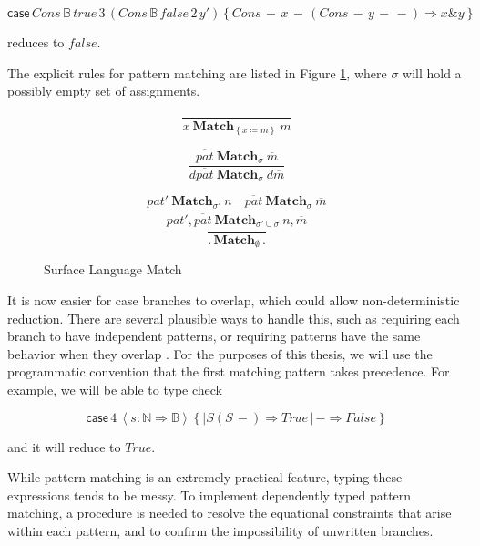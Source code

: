 $\mathsf{case}\,Cons\,\mathbb{B}\,true\,3\,\left(Cons\,\mathbb{B}\,false\,2\,y'\right)\left\{ Cons\,-\,x\,-\,\left(Cons\,-\,y\,-\,-\right)\Rightarrow x\&y\right\} $

reduces to $false$.

The explicit rules for pattern matching are listed in Figure \ref{fig:surface-data-match}, where $\sigma$ will hold a possibly empty set of assignments.

\begin{figure}
\[
\frac{\,}{x\ \mathbf{Match}_{\left\{ x\coloneqq m\right\} }\ m}
\]

\[
\frac{\overline{pat}\ \mathbf{Match}_{\sigma}\ \overline{m}}{d\overline{pat}\ \mathbf{Match}_{\sigma}\ d\overline{m}}
\]

\[
\frac{pat'\ \mathbf{Match}_{\sigma'}\ n\quad\overline{pat}\ \mathbf{Match}_{\sigma}\ \overline{m}}{pat',\overline{pat}\ \mathbf{Match}_{\sigma'\cup\sigma}\ n,\overline{m}}
\]
\[
\frac{\,}{.\,\mathbf{Match}_{\emptyset}\,.}
\]

\caption{Surface Language Match}
\label{fig:surface-data-match}
\end{figure}

It is now easier for case branches to overlap, which could allow non-deterministic reduction.
There are several plausible ways to handle this, such as requiring each branch to have independent patterns, or requiring patterns have the same behavior when they overlap \cite{10.1007/978-3-642-54833-8_6}.
For the purposes of this thesis, we will use the programmatic convention that the first matching pattern takes precedence.
For example, we will be able to type check

\[
\mathsf{case}\,4\,\left\langle s:\mathbb{N}\Rightarrow\mathbb{B}\right\rangle \left\{ |S\left(S\,-\right)\Rightarrow True\,|\,-\Rightarrow False\right\} 
\]

and it will reduce to $True$.

While pattern matching is an extremely practical feature, typing these expressions tends to be messy.
To implement dependently typed pattern matching, a procedure is needed to resolve the equational constraints that arise within each pattern, and to confirm the impossibility of unwritten branches.

